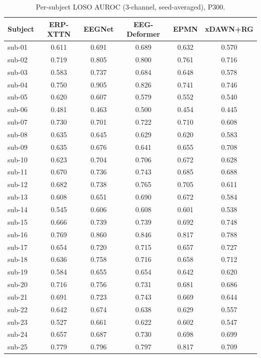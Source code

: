 \begin{table}[t]
\centering
\scriptsize
\caption{Per-subject LOSO AUROC (3-channel, seed-averaged), P300.}
\label{tab:persubj-p300}
\begin{tabular}{lccccc}
\toprule
Subject & ERP-XTTN & EEGNet & EEG-Deformer & EPMN & xDAWN+RG \\
\midrule
sub-01 & 0.611 & 0.691 & 0.689 & 0.632 & 0.570 \\
sub-02 & 0.719 & 0.805 & 0.800 & 0.761 & 0.716 \\
sub-03 & 0.583 & 0.737 & 0.684 & 0.648 & 0.578 \\
sub-04 & 0.750 & 0.905 & 0.826 & 0.741 & 0.746 \\
sub-05 & 0.620 & 0.607 & 0.579 & 0.552 & 0.540 \\
sub-06 & 0.481 & 0.463 & 0.500 & 0.454 & 0.445 \\
sub-07 & 0.730 & 0.701 & 0.722 & 0.710 & 0.608 \\
sub-08 & 0.635 & 0.645 & 0.629 & 0.620 & 0.583 \\
sub-09 & 0.635 & 0.676 & 0.641 & 0.655 & 0.708 \\
sub-10 & 0.623 & 0.704 & 0.706 & 0.672 & 0.628 \\
sub-11 & 0.670 & 0.736 & 0.743 & 0.685 & 0.688 \\
sub-12 & 0.682 & 0.738 & 0.765 & 0.705 & 0.611 \\
sub-13 & 0.608 & 0.651 & 0.690 & 0.672 & 0.584 \\
sub-14 & 0.545 & 0.606 & 0.608 & 0.601 & 0.538 \\
sub-15 & 0.666 & 0.739 & 0.739 & 0.692 & 0.748 \\
sub-16 & 0.769 & 0.860 & 0.846 & 0.817 & 0.788 \\
sub-17 & 0.654 & 0.720 & 0.715 & 0.657 & 0.727 \\
sub-18 & 0.636 & 0.758 & 0.716 & 0.658 & 0.712 \\
sub-19 & 0.584 & 0.655 & 0.654 & 0.642 & 0.620 \\
sub-20 & 0.716 & 0.756 & 0.731 & 0.681 & 0.686 \\
sub-21 & 0.691 & 0.723 & 0.743 & 0.669 & 0.644 \\
sub-22 & 0.642 & 0.674 & 0.638 & 0.629 & 0.557 \\
sub-23 & 0.527 & 0.661 & 0.622 & 0.602 & 0.547 \\
sub-24 & 0.657 & 0.687 & 0.730 & 0.698 & 0.699 \\
sub-25 & 0.779 & 0.796 & 0.797 & 0.817 & 0.709 \\

\end{tabular}
\end{table}
